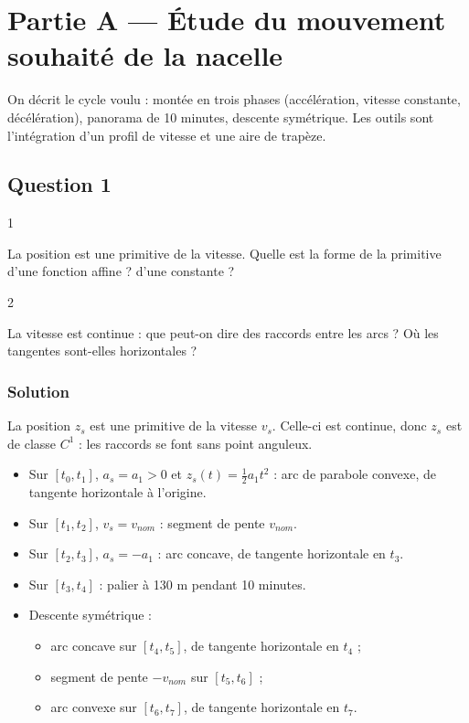 \documentclass[11pt,a4paper]{article}
\providecommand{\tightlist}{\setlength{\itemsep}{0pt}\setlength{\parskip}{0pt}}
\begin{document}
\hypertarget{partie-a-uxe9tude-du-mouvement-souhaituxe9-de-la-nacelle}{%
\section{Partie A --- Étude du mouvement souhaité de la nacelle}\label{partie-a-uxe9tude-du-mouvement-souhaituxe9-de-la-nacelle}}

On décrit le cycle voulu : montée en trois phases (accélération, vitesse constante, décélération), panorama de 10 minutes, descente symétrique. Les outils sont l'intégration d'un profil de vitesse et une aire de trapèze.

\hypertarget{question-1}{%
\subsection{Question 1}\label{question-1}}

\begin{indication}{1}

La position est une primitive de la vitesse. Quelle est la forme de la primitive d'une fonction affine ? d'une constante ?

\end{indication}

\begin{indication}{2}

La vitesse est continue : que peut-on dire des raccords entre les arcs ? Où les tangentes sont-elles horizontales ?

\end{indication}

\hypertarget{solution}{%
\subsubsection{Solution}\label{solution}}

La position \(z_s\) est une primitive de la vitesse \(v_s\). Celle-ci est continue, donc \(z_s\) est de classe \(C^1\) : les raccords se font sans point anguleux.

\begin{itemize}
\tightlist
\item
  Sur \([t_0,t_1]\), \(a_s=a_1>0\) et \(z_s(t)=\tfrac12a_1t^2\) : arc de parabole convexe, de tangente horizontale à l'origine.
\item
  Sur \([t_1,t_2]\), \(v_s=v_{nom}\) : segment de pente \(v_{nom}\).
\item
  Sur \([t_2,t_3]\), \(a_s=-a_1\) : arc concave, de tangente horizontale en \(t_3\).
\item
  Sur \([t_3,t_4]\) : palier à 130 m pendant 10 minutes.
\item
  Descente symétrique :

  \begin{itemize}
  \tightlist
  \item
    arc concave sur \([t_4,t_5]\), de tangente horizontale en \(t_4\) ;
  \item
    segment de pente \(-v_{nom}\) sur \([t_5,t_6]\) ;
  \item
    arc convexe sur \([t_6,t_7]\), de tangente horizontale en \(t_7\).
  \end{itemize}
\end{itemize}
\end{document}
